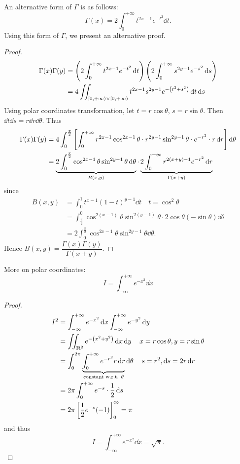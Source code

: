 An alternative form of $\Gamma$ is as follows:
\[\Gamma(x)=2\int_0^{+\infty}t^{2x-1}e^{-t^2}\dd{t}.\]
Using this form of $\Gamma$, we present an alternative proof.

\begin{proof}
\begin{align*}
\Gamma(x)\Gamma(y)
&=\left(2\int_0^{+\infty}t^{2x-1}e^{-t^2}\dd{t}\right)\left(2\int_0^{+\infty}s^{2y-1}e^{-s^2}\dd{s}\right)\\
&=4\iint_{[0,+\infty)\times[0,+\infty)}t^{2x-1}s^{2y-1}e^{-\left(t^2+s^2\right)}\dd{t}\dd{s}
\end{align*}
Using polar coordinates transformation, let $t=r\cos\theta$, $s=r\sin\theta$. Then $\dd{t}\dd{s}=r\dd{r}\dd{\theta}$. Thus
\begin{align*}
\Gamma(x)\Gamma(y)
&=4\int_0^\frac{\pi}{2}\left[\int_0^{+\infty}r^{2x-1}\cos^{2x-1}\theta\cdot r^{2y-1}\sin^{2y-1}\theta\cdot e^{-r^2}\cdot r\dd{r}\right]\dd{\theta}\\
&=\underbrace{2\int_0^\frac{\pi}{2}\cos^{2x-1}\theta\sin^{2y-1}\theta\dd{\theta}}_{B(x,y)}\cdot\underbrace{2\int_0^{+\infty}r^{2(x+y)-1}e^{-r^2}\dd{r}}_{\Gamma(x+y)}
\end{align*}
since
\begin{align*}
B(x,y)&=\int_0^1 t^{x-1}(1-t)^{y-1}\dd{t}\quad t=\cos^2\theta\\
&=\int_\frac{\pi}{2}^0 \cos^{2(x-1)}\theta\sin^{2(y-1)}\theta\cdot2\cos\theta(-\sin\theta)\dd{\theta}\\
&=2\int_0^\frac{\pi}{2}\cos^{2x-1}\theta\sin^{2y-1}\theta\dd{\theta}.
\end{align*}
Hence $B(x,y)=\dfrac{\Gamma(x)\Gamma(y)}{\Gamma(x+y)}$.
\end{proof}

More on polar coordinates:
\begin{equation}
I=\int_{-\infty}^{+\infty}e^{-x^2}\dd{x}
\end{equation}

\begin{proof}
\begin{align*}
I^2&=\int_{-\infty}^{+\infty}e^{-x^2}\dd{x}\int_{-\infty}^{+\infty}e^{-y^2}\dd{y}\\
&=\iint_{\mathbf R^2}e^{-\left(x^2+y^2\right)}\dd{x}\dd{y}\quad x=r\cos\theta,y=r\sin\theta\\
&=\int_0^{2\pi}\underbrace{\int_0^{+\infty}e^{-r^2}r\dd{r}}_\text{constant w.r.t. $\theta$}\dd{\theta}\quad s=r^2,\dd{s}=2r\dd{r}\\
&=2\pi\int_0^{+\infty}e^{-s}\cdot\frac{1}{2}\dd{s}\\
&=2\pi\left[\frac{1}{2}e^{-s}(-1)\right]_0^\infty=\pi
\end{align*}
and thus
\[I=\int_{-\infty}^{+\infty}e^{-x^2}\dd{x}=\sqrt{\pi}.\]
\end{proof}

